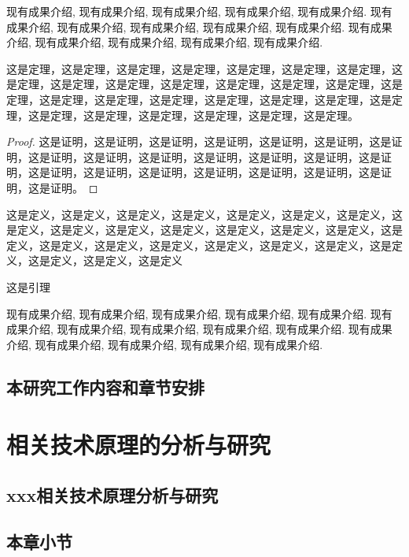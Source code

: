 \documentclass[UTF8,openright]{ctexbook}
\begin{document}
现有成果介绍, 现有成果介绍, 现有成果介绍, 现有成果介绍, 现有成果介绍.
现有成果介绍, 现有成果介绍, 现有成果介绍, 现有成果介绍, 现有成果介绍.
现有成果介绍, 现有成果介绍, 现有成果介绍, 现有成果介绍, 现有成果介绍.
\begin{theorem}
  这是定理，这是定理，这是定理，这是定理，这是定理，这是定理，这是定理，这是定理，这是定理，这是定理，这是定理，这是定理，这是定理，这是定理，这是定理，这是定理，这是定理，这是定理，这是定理，这是定理，这是定理，这是定理，这是定理，这是定理，这是定理，这是定理，这是定理，这是定理。
\end{theorem}
\begin{proof}
  这是证明，这是证明，这是证明，这是证明，这是证明，这是证明，这是证明，这是证明，这是证明，这是证明，这是证明，这是证明，这是证明，这是证明，这是证明，这是证明，这是证明，这是证明，这是证明，这是证明，这是证明，这是证明。
\end{proof}
\begin{definition}
  这是定义，这是定义，这是定义，这是定义，这是定义，这是定义，这是定义，这是定义，这是定义，这是定义，这是定义，这是定义，这是定义，这是定义，这是定义，这是定义，这是定义，这是定义，这是定义，这是定义，这是定义，这是定义，这是定义，这是定义，这是定义
\end{definition}
\begin{lemma}
  这是引理
\end{lemma}
现有成果介绍, 现有成果介绍, 现有成果介绍, 现有成果介绍, 现有成果介绍.
现有成果介绍, 现有成果介绍, 现有成果介绍, 现有成果介绍, 现有成果介绍.
现有成果介绍, 现有成果介绍, 现有成果介绍, 现有成果介绍, 现有成果介绍.

\section {本研究工作内容和章节安排}


\chapter {相关技术原理的分析与研究}


\section {xxx相关技术原理分析与研究}


\section {本章小节}
\end{document}
